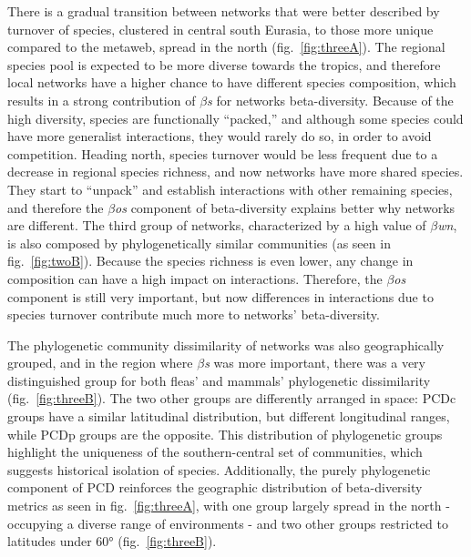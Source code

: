 \documentclass[12pt]{article}
\begin{document}
There is a gradual transition between networks that were better
described by turnover of species, clustered in central south Eurasia, to
those more unique compared to the metaweb, spread in the north
(fig.~\ref{fig:threeA}). The regional species pool is expected to be
more diverse towards the tropics, and therefore local networks have a
higher chance to have different species composition, which results in a
strong contribution of \emph{\(\beta\)s} for networks beta-diversity.
Because of the high diversity, species are functionally ``packed,'' and
although some species could have more generalist interactions, they
would rarely do so, in order to avoid competition. Heading north,
species turnover would be less frequent due to a decrease in regional
species richness, and now networks have more shared species. They start
to ``unpack'' and establish interactions with other remaining species,
and therefore the \emph{\(\beta\)os} component of beta-diversity
explains better why networks are different. The third group of networks,
characterized by a high value of \emph{\(\beta\)wn}, is also composed by
phylogenetically similar communities (as seen in fig.~\ref{fig:twoB}).
Because the species richness is even lower, any change in composition
can have a high impact on interactions. Therefore, the
\emph{\(\beta\)os} component is still very important, but now
differences in interactions due to species turnover contribute much more
to networks' beta-diversity.

The phylogenetic community dissimilarity of networks was also
geographically grouped, and in the region where \emph{\(\beta\)s} was
more important, there was a very distinguished group for both fleas' and
mammals' phylogenetic dissimilarity (fig.~\ref{fig:threeB}). The two
other groups are differently arranged in space: PCDc groups have a
similar latitudinal distribution, but different longitudinal ranges,
while PCDp groups are the opposite. This distribution of phylogenetic
groups highlight the uniqueness of the southern-central set of
communities, which suggests historical isolation of species.
Additionally, the purely phylogenetic component of PCD reinforces the
geographic distribution of beta-diversity metrics as seen in
fig.~\ref{fig:threeA}, with one group largely spread in the north -
occupying a diverse range of environments - and two other groups
restricted to latitudes under 60° (fig.~\ref{fig:threeB}).
\end{document}
